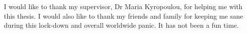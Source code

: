 \begin{acknowledgements}
I would like to thank my supervisor, Dr Maria Kyropoulou, for helping me with this thesis. I would also like to thank my friends and family for keeping me sane during this lock-down and overall worldwide panic. It has not been a fun time.\end{acknowledgements}